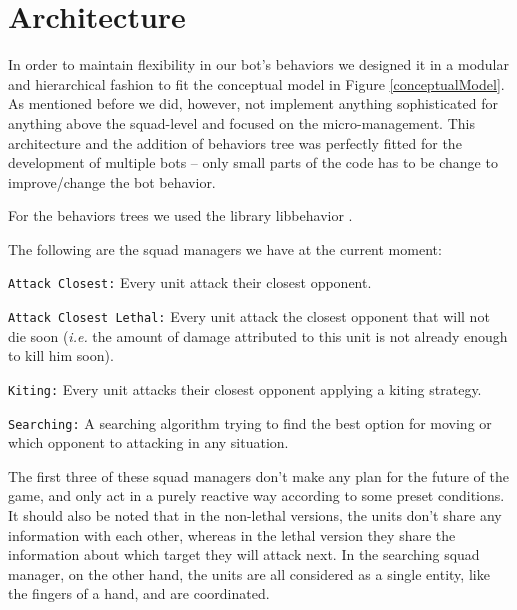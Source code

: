 \section{Architecture}
In order to maintain flexibility in our bot's behaviors we designed it in a modular and hierarchical fashion to fit the conceptual model in Figure \ref{conceptualModel}. As mentioned before we did, however, not implement anything sophisticated for anything above the squad-level and focused on the micro-management.
This architecture and the addition of behaviors tree was perfectly fitted for the development of multiple bots -- only small parts of the code has to be change to improve/change the bot behavior.

For the behaviors trees we used the library libbehavior \cite{libbehavior}.

The following are the squad managers we have at the current moment:
\begin{shortitem}
\item \texttt{Attack Closest:} Every unit attack their closest opponent.
\item \texttt{Attack Closest Lethal:} Every unit attack the closest opponent that will not die soon (\emph{i.e.} the amount of damage attributed to this unit is not already enough to kill him soon).
\item \texttt{Kiting:} Every unit attacks their closest opponent applying a kiting strategy.
\item \texttt{Searching:} A searching algorithm trying to find the best option for moving or which opponent to attacking in any situation.
\end{shortitem}

The first three of these squad managers don't make any plan for the future of the game, and only act in a purely reactive way according to some preset conditions. It should also be noted that in the non-lethal versions, the units don't share any information with each other, whereas in the lethal version they share the information about which target they will attack next. In the searching squad manager, on the other hand, the units are all considered as a single entity, like the fingers of a hand, and are coordinated.


